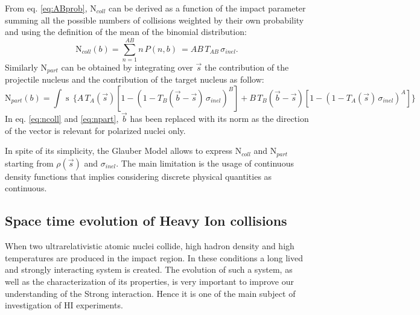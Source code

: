 From eq. \ref{eq:ABprob}, $\mathrm{N}_{coll}$ can be derived as a function of the impact parameter 
summing all the possible numbers of collisions weighted by their own probability and using the
definition of the mean of the binomial distribution:
\begin{equation} \label{eq:ncoll}
    \mathrm{N}_{coll}(b) = \sum_{n=1}^{AB} n\, P(n,b) \ = AB\, T_{AB}\, \sigma_{inel}.
\end{equation}
Similarly $\mathrm{N}_{part}$ can be obtained by integrating over $\vec{s}$ the contribution of the
projectile nucleus and the contribution of the target nucleus as follow:
\begin{equation} \label{eq:npart}
    \mathrm{N}_{part}(b) = \int \mathop{d^{2}s} \, \bigl\{ A\, T_{A}(\vec{s})[1-(1- T_{B}(\vec{b}-\vec{s})\, \sigma_{inel})^{B}
    ] + B\, T_{B}(\vec{b}-\vec{s}) [1-(1-T_{A}(\vec{s})\,\sigma_{inel})^{A}] \bigr\}
\end{equation}
In eq. \ref{eq:ncoll} and \ref{eq:npart}, $\vec{b}$ has been replaced with its norm as the direction 
of the vector is relevant for polarized nuclei only.

In spite of its simplicity, the Glauber Model allows to express $\mathrm{N}_{coll}$ and 
$\mathrm{N}_{part}$ starting from $\rho(\vec{s})$ and $\sigma_{inel}$. The main limitation
is the usage of continuous density functions that implies considering discrete physical quantities 
as continuous.

%
\subsection{Space time evolution of Heavy Ion collisions} \label{sec:1.3.2}

When two ultrarelativistic atomic nuclei collide, high hadron density and high temperatures
are produced in the impact region. 
In these conditions a long lived and strongly interacting system is created.
The evolution of such a system, as well as the characterization of its properties, is very important
to improve our understanding of the Strong interaction. Hence it is one of the main subject of 
investigation of HI experiments.

